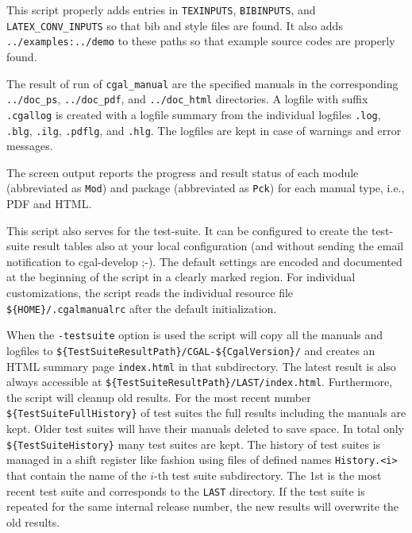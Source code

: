 This script properly adds entries in \texttt{TEXINPUTS},
\texttt{BIBINPUTS}, and \texttt{LATEX\_CONV\_INPUTS} so that bib and
style files are found. It also adds \texttt{../examples:../demo} to
these paths so that example source codes are properly found.

The result of run of \texttt{cgal\_manual} are the specified manuals
in the corresponding \texttt{../doc\_ps}, \texttt{../doc\_pdf}, and
\texttt{../doc\_html} directories. A logfile with suffix
\texttt{.cgallog} is created with a logfile summary from the
individual logfiles \texttt{.log}, \texttt{.blg}, \texttt{.ilg},
\texttt{.pdflg}, and \texttt{.hlg}. The logfiles are kept in case of
warnings and error messages.

The screen output reports the progress and result status of each
module (abbreviated as \texttt{Mod}) and package (abbreviated as
\texttt{Pck}) for each manual type, i.e., PDF and HTML.

This script also serves for the test-suite. It can be configured to
create the test-suite result tables also at your local configuration
(and without sending the email notification to cgal-develop ;-).
The default settings are encoded and documented at the beginning of
the script in a clearly marked region. For individual customizations,
the script reads the individual resource file
\verb|${HOME}/.cgalmanualrc| after the default initialization.

When the \texttt{-testsuite} option is used the script will copy all
the manuals and logfiles to
\verb|${TestSuiteResultPath}/CGAL-${CgalVersion}/| and creates an HTML
summary page \texttt{index.html} in that subdirectory. The latest
result is also always accessible at
\verb|${TestSuiteResultPath}/LAST/index.html|.  Furthermore, the
script will cleanup old results. For the most recent number
\verb|${TestSuiteFullHistory}| of test suites the full results
including the manuals are kept. Older test suites will have their
manuals deleted to save space. In total only
\verb|${TestSuiteHistory}| many test suites are kept.  The history of
test suites is managed in a shift register like fashion using files of
defined names \texttt{History.<i>} that contain the name of the $i$-th
test suite subdirectory. The 1st is the most recent test suite and
corresponds to the \texttt{LAST} directory.  If the test suite is
repeated for the same internal release number, the new results will
overwrite the old results.


